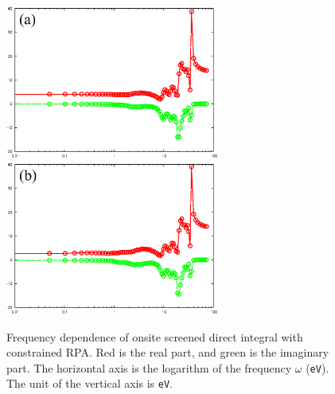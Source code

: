 \documentclass{article}
\begin{document}
\begin{figure}[H] 
\centering
\includegraphics[width=7cm]{UvsE-cRPA-La2CuO4.eps}
\includegraphics[width=7cm]{UvsE-fRPA-La2CuO4.eps}
\caption{Frequency dependence of onsite screened direct integral with constrained RPA. Red is the real part, and green is the imaginary part. The horizontal axis is the logarithm of the frequency $\omega$ ({\tt eV}). The unit of the vertical axis is {\tt eV}.}
\label{UvsE-cRPA-La2CuO4}
\end{figure}

\clearpage 
\end{document}
